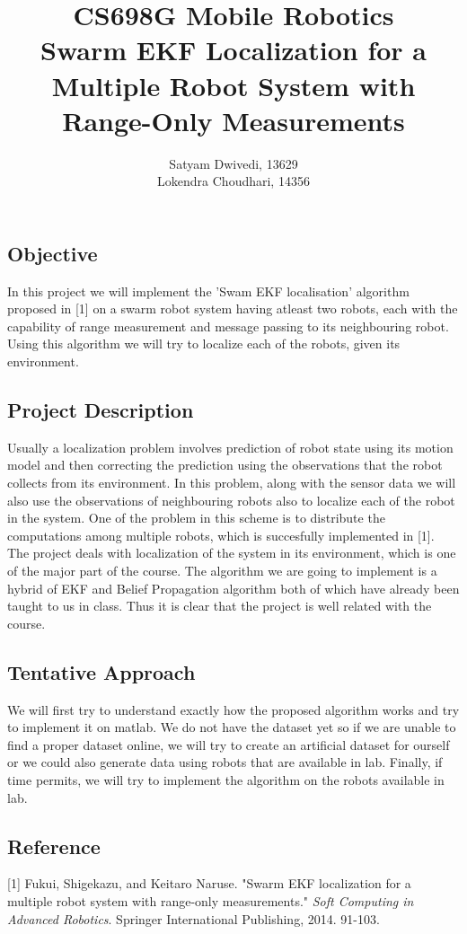 \documentclass[12pt,a4paper]{article}
\title{CS698G Mobile Robotics\\Swarm EKF Localization for a Multiple Robot System with Range-Only Measurements}
\author{Satyam Dwivedi, 13629\\Lokendra Choudhari, 14356}
\begin{document}
\maketitle

\subsection*{Objective}
In this project we will implement the 'Swam EKF localisation' algorithm proposed in [1] on  a swarm robot system having atleast two robots, each with the capability of range measurement and message passing to its neighbouring robot. Using this algorithm we will try to localize each of the robots, given its environment.
\subsection*{Project Description}
Usually a localization problem involves prediction of robot state using its motion model and then correcting the prediction using the observations that the robot collects from its environment. In this problem, along with the sensor data we will also use the observations of neighbouring robots also to localize each of the robot in the system. One of the problem in this scheme is to distribute the computations among multiple robots, which is succesfully implemented in [1].\\
\indent The project deals with localization of the system in its environment, which is one of the major part of the course. The algorithm we are going to implement is a hybrid of EKF and Belief Propagation algorithm both of which have already been taught to us in class. Thus  it is clear that the project is well related with the course.
\subsection*{Tentative Approach}
We will first try to understand exactly how the proposed algorithm works and try to implement it on matlab. We do not have the dataset yet so if we are unable to find a proper dataset online, we will try to create an artificial dataset for ourself or we could also generate data using robots that are available in lab. Finally, if time permits, we will try to implement the algorithm on the robots available in lab.

\subsection*{Reference}
[1] Fukui, Shigekazu, and Keitaro Naruse. "Swarm EKF localization for a multiple robot system with range-only measurements." \textit{Soft Computing in Advanced Robotics}. Springer International Publishing, 2014. 91-103.
\end{document}

